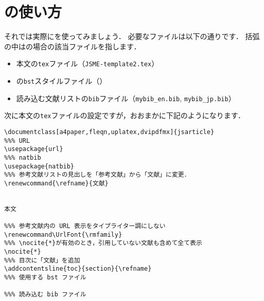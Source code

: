 \clearpage
\section{\jsmefile の使い方}
\label{sec:howtouse}
それでは実際に\jsmefile を使ってみましょう．
必要なファイルは以下の通りです．
括弧の中は\JSMErepos の場合の該当ファイルを指します．
\begin{itemize}
    \item 本文の\verb|tex|ファイル（\verb|JSME-template2.tex|）
    \item \BibTeX{}の\verb|bst|スタイルファイル（\jsmefile）
    \item 読み込む文献リストの\verb|bib|ファイル（\verb|mybib_en.bib|, \verb|mybib_jp.bib|）
\end{itemize}
次に本文の\verb|tex|ファイルの設定ですが，おおまかに下記のようになります．
\begin{tcolorbox}[enhanced, title=\textgt{本文の\texttt{tex}ファイルに必要な設定}, drop fuzzy shadow]
\begin{verbatim}
\documentclass[a4paper,fleqn,uplatex,dvipdfmx]{jsarticle}
%%% URL
\usepackage{url}
%%% natbib
\usepackage{natbib}
%%% 参考文献リストの見出しを「参考文献」から「文献」に変更．
\renewcommand{\refname}{文献}


本文

%%% 参考文献内の URL 表示をタイプライター調にしない
\renewcommand\UrlFont{\rmfamily}
%%% \nocite{*}が有効のとき，引用していない文献も含めて全て表示
\nocite{*}
%%% 目次に「文献」を追加
\addcontentsline{toc}{section}{\refname}
%%% 使用する bst ファイル

%%% 読み込む bib ファイル


\end{verbatim}
\end{tcolorbox}

